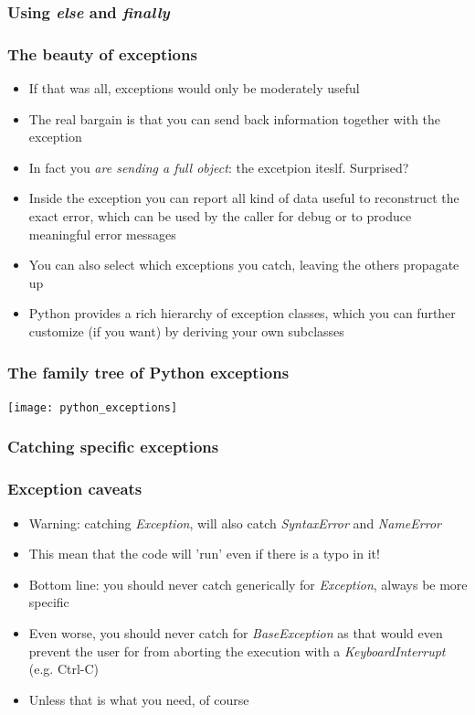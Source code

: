 \documentclass[9pt]{beamer}
\begin{document}
\begin{frame}
  \frametitle{Using \emph{else} and \emph{finally}}
  
\end{frame}


\begin{frame}
  \frametitle{The beauty of exceptions}
  \begin{itemize}
    \item If that was all, exceptions would only be moderately useful
    \item The real bargain is that you can send back information together with the exception
    \item In fact you \textit{are sending a full object}: the excetpion iteslf. Surprised?
    \item Inside the exception you can report all kind of data useful to reconstruct the exact error,
          which can be used by the caller for debug or to produce meaningful error messages
    \item You can also select which exceptions you catch, leaving the others propagate up
    \item Python provides a rich hierarchy of exception classes, which you can further customize
          (if you want) by deriving your own subclasses
  \end{itemize}
\end{frame}


\begin{frame}
  \frametitle{The family tree of Python exceptions}
  \centering\texttt{[image: python\_exceptions]}
\end{frame}


\begin{frame}
  \frametitle{Catching specific exceptions}
  
\end{frame}


\begin{frame}
  \frametitle{Exception caveats}
  \begin{itemize}
    \item Warning: catching \emph{Exception}, will also catch \emph{SyntaxError}
          and \emph{NameError}
    \medskip
    \item This mean that the code will 'run' even if there is a typo in it!
    \medskip
    \item Bottom line: \alert{you should never catch generically for \emph{Exception}},
          always be more specific
    \medskip
    \item Even worse, you should never catch for \emph{BaseException} as
          that would even prevent the user for from aborting the execution with a
          \emph{KeyboardInterrupt} (e.g. Ctrl-C)
    \medskip
    \item Unless that is what you need, of course
  \end{itemize}
\end{frame}
\end{document}
